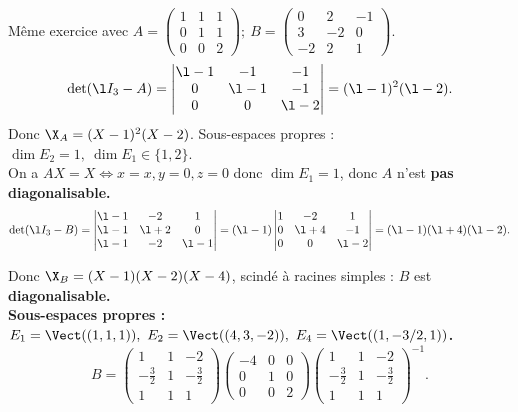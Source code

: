 \documentclass[11pt]{article}
\begin{document}
\begin{ex}{}{}
    Même exercice avec $A=\begin{pmatrix}1&1&1\\0&1&1\\0&0&2\end{pmatrix}; ~ B=\begin{pmatrix}0&2&-1\\3&-2&0\\-2&2&1\end{pmatrix}$.
    \tcblower
    \begin{equation*}
        \det(\l I_3 - A) = \begin{vmatrix}\l-1&-1&-1\\0&\l-1&-1\\0&0&\l-2\end{vmatrix}=(\l-1)^2(\l-2).
    \end{equation*}
    Donc $\X_A = (X-1)^2(X-2)$. Sous-espaces propres : $\dim E_2 = 1, ~ \dim E_1 \in \{1,2\}$.\\
    On a $AX=X\iff x=x, y=0, z=0$ donc $\dim E_1=1$, donc $A$ n'est \bf{pas diagonalisable}.\n
    \begin{equation*}
        \det(\l I_3 - B)=\begin{vmatrix}\l-1&-2&1\\\l-1&\l+2&0\\\l-1&-2&\l-1\end{vmatrix}=(\l-1)\begin{vmatrix}1&-2&1\\0&\l+4&-1\\0&0&\l-2\end{vmatrix}=(\l-1)(\l+4)(\l-2).
    \end{equation*}

    Donc $\X_B=(X-1)(X-2)(X-4)$, scindé à racines simples : $B$ est \bf{diagonalisable}.\\
    Sous-espaces propres : $E_1=\Vect((1,1,1)), ~ E_2=\Vect((4,3,-2)), ~ E_4=\Vect((1,-3/2,1))$.
    \begin{equation*}
        B = \begin{pmatrix}1&1&-2\\-\frac{3}{2}&1&-\frac{3}{2}\\1&1&1\end{pmatrix}\begin{pmatrix}-4&0&0\\0&1&0\\0&0&2\end{pmatrix}\begin{pmatrix}1&1&-2\\-\frac{3}{2}&1&-\frac{3}{2}\\1&1&1\end{pmatrix}^{-1}.
    \end{equation*}
\end{ex}
\end{document}
